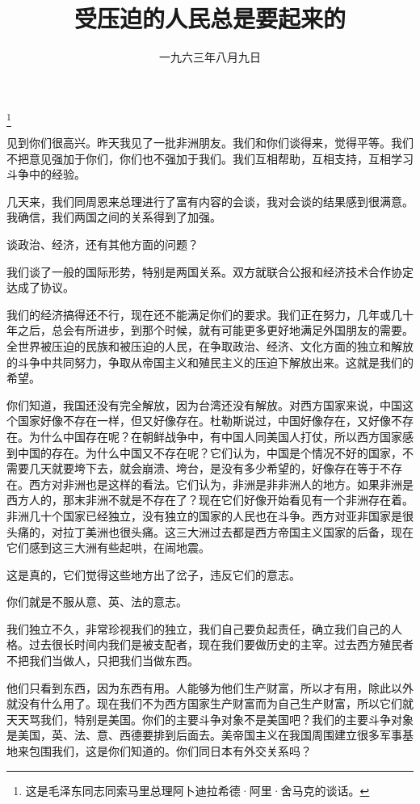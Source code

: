 
\title{受压迫的人民总是要起来的}
\date{一九六三年八月九日}
\thanks{这是毛泽东同志同索马里总理阿卜迪拉希德·阿里·舍马克的谈话。}
\maketitle


见到你们很高兴。昨天我见了一批非洲朋友。我们和你们谈得来，觉得平等。我们不把意见强加于你们，你们也不强加于我们。我们互相帮助，互相支持，互相学习斗争中的经验。

几天来，我们同周恩来总理进行了富有内容的会谈，我对会谈的结果感到很满意。我确信，我们两国之间的关系得到了加强。

谈政治、经济，还有其他方面的问题？

我们谈了一般的国际形势，特别是两国关系。双方就联合公报和经济技术合作协定达成了协议。

我们的经济搞得还不行，现在还不能满足你们的要求。我们正在努力，几年或几十年之后，总会有所进步，到那个时候，就有可能更多更好地满足外国朋友的需要。全世界被压迫的民族和被压迫的人民，在争取政治、经济、文化方面的独立和解放的斗争中共同努力，争取从帝国主义和殖民主义的压迫下解放出来。这就是我们的希望。

你们知道，我国还没有完全解放，因为台湾还没有解放。对西方国家来说，中国这个国家好像不存在一样，但又好像存在。杜勒斯说过，中国好像存在，又好像不存在。为什么中国存在呢？在朝鲜战争中，有中国人同美国人打仗，所以西方国家感到中国的存在。为什么中国又不存在呢？它们认为，中国是个情况不好的国家，不需要几天就要垮下去，就会崩溃、垮台，是没有多少希望的，好像存在等于不存在。西方对非洲也是这样的看法。它们认为，非洲是非非洲人的地方。如果非洲是西方人的，那末非洲不就是不存在了？现在它们好像开始看见有一个非洲存在着。非洲几十个国家已经独立，没有独立的国家的人民也在斗争。西方对亚非国家是很头痛的，对拉丁美洲也很头痛。这三大洲过去都是西方帝国主义国家的后备，现在它们感到这三大洲有些起哄，在闹地震。

这是真的，它们觉得这些地方出了岔子，违反它们的意志。

你们就是不服从意、英、法的意志。

我们独立不久，非常珍视我们的独立，我们自己要负起责任，确立我们自己的人格。过去很长时间内我们是被支配者，现在我们要做历史的主宰。过去西方殖民者不把我们当做人，只把我们当做东西。

他们只看到东西，因为东西有用。人能够为他们生产财富，所以才有用，除此以外就没有什么用了。现在我们不为西方国家生产财富而为自己生产财富，所以它们就天天骂我们，特别是美国。你们的主要斗争对象不是美国吧？我们的主要斗争对象是美国，英、法、意、西德要排到后面去。美帝国主义在我国周围建立很多军事基地来包围我们，这是你们知道的。你们同日本有外交关系吗？

